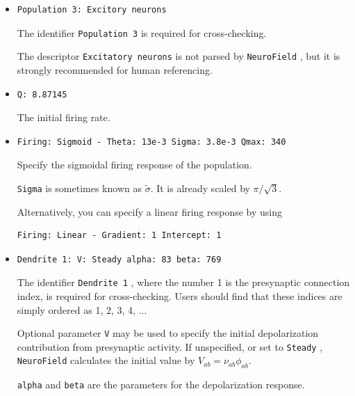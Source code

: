 \documentclass[12pt,a4paper]{article}
\newcommand{\type}[1]{ {\small\small\tt #1} }
\newcommand{\NF}[0]{ \type{NeuroField}}
\begin{document}
\begin{description}
	\begin{itemize}
	\item
	\begin{lstlisting}
Population 3: Excitory neurons
	\end{lstlisting}
	The identifier \type{Population 3} is required for cross-checking.
	
	The descriptor \type{Excitatory neurons} is not parsed by \NF, but it is strongly recommended for human referencing.
	\item
	\begin{lstlisting}
Q: 8.87145
	\end{lstlisting}
	The initial firing rate.
	\item
	\begin{lstlisting}
Firing: Sigmoid - Theta: 13e-3 Sigma: 3.8e-3 Qmax: 340
	\end{lstlisting}
	Specify the sigmoidal firing response of the population.

	\type{Sigma} is sometimes known as \(\tilde{\sigma}\). It is already scaled by \(\pi/\sqrt{3}\).

	Alternatively, you can specify a linear firing response by using
	\begin{lstlisting}
Firing: Linear - Gradient: 1 Intercept: 1
	\end{lstlisting}

	\item
	\begin{lstlisting}
Dendrite 1: V: Steady alpha: 83 beta: 769
	\end{lstlisting}
	The identifier \type{Dendrite 1}, where the number 1 is the presynaptic connection index, is required for cross-checking. Users should find that these indices are simply ordered as 1, 2, 3, 4, ...
	
	Optional parameter \type{V} may be used to specify the initial depolarization contribution from presynaptic activity. If unspecified, or set to \type{Steady}, \NF calculates the initial value by \(V_{ab}=\nu_{ab}\phi_{ab}\).

	\type{alpha} and \type{beta} are the parameters for the depolarization response.
	\end{itemize}
\end{description}
\end{document}
